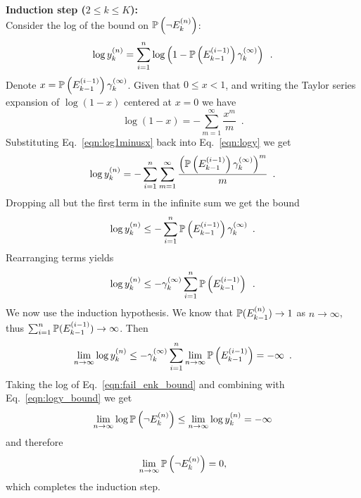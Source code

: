 \noindent
\textbf{Induction step ($2 \leq k \leq K$): }\\
Consider the log of the bound on $\mathbb{P}\left( \neg E^{(n)}_k \right)$:
\begin{equation}
    \log y^{(n)}_k = \sum_{i=1}^n \log\left( 1 - \mathbb{P}\left( E^{(i-1)}_{k-1} \right) \gamma_k^{(\infty)} \right) \enspace .
    \label{eqn:logy}
\end{equation}
Denote $x = \mathbb{P}\left( E^{(i-1)}_{k-1} \right) \gamma_k^{(\infty)}$. Given that $0 \leq x < 1$, and writing the Taylor series expansion of $\log\left( 1 - x \right)$ centered at $x = 0$ we have
\begin{equation}
    \log \left( 1 - x \right) = - \sum_{m=1}^\infty \frac{x^m}{m} \enspace .
    \label{eqn:log1minusx}
\end{equation}
Substituting Eq.~\eqref{eqn:log1minusx} back into Eq.~\eqref{eqn:logy} we get
\begin{equation}
    \log y^{(n)}_k = - \sum_{i=1}^n \sum_{m=1}^\infty \frac{\left( \mathbb{P}\left( E^{(i-1)}_{k-1} \right) \gamma_k^{(\infty)} \right)^m}{m} \enspace .
\end{equation}
Dropping all but the first term in the infinite sum we get the bound
\begin{equation}
    \log y^{(n)}_k \leq -\sum_{i=1}^n \mathbb{P}\left( E^{(i-1)}_{k-1} \right) \gamma_k^{(\infty)} \enspace .
\end{equation}
Rearranging terms yields
\begin{equation}
    \log y^{(n)}_k \leq -\gamma_k^{(\infty)} \sum_{i=1}^n \mathbb{P}\left( E^{(i-1)}_{k-1} \right) \enspace .
\end{equation}
We now use the induction hypothesis. We know that $\mathbb{P}( E^{(n)}_{k-1} ) \rightarrow 1$ as $n \rightarrow \infty$, thus $\sum_{i=1}^n \mathbb{P}( E^{(i-1)}_{k-1} ) \rightarrow \infty$. Then
\begin{equation}
    \lim_{n \rightarrow \infty} \log y^{(n)}_k \leq -\gamma_k^{(\infty)} \sum_{i=1}^n \lim_{n \rightarrow \infty} \mathbb{P}\left( E^{(i-1)}_{k-1} \right) = -\infty \enspace .
    \label{eqn:logy_bound}
\end{equation}
Taking the log of Eq.~\eqref{eqn:fail_enk_bound} and combining with Eq.~\eqref{eqn:logy_bound} we get
\begin{equation}
    \lim_{n \rightarrow \infty} \log \mathbb{P}\left( \neg E^{(n)}_k \right) \leq \lim_{n \rightarrow \infty} \log y^{(n)}_k = -\infty
\end{equation}
and therefore
\begin{equation}
    \lim_{n \rightarrow \infty} \mathbb{P}\left( \neg E^{(n)}_k \right) = 0 ,
\end{equation}
which completes the induction step.


